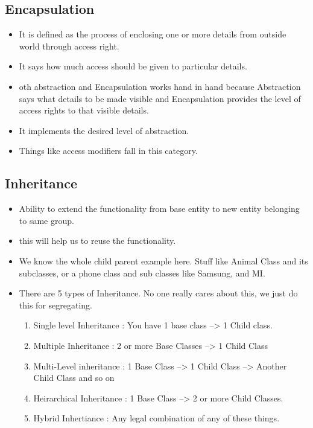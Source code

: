 \documentclass[11pt]{article}
\begin{document}
\subsection{Encapsulation}
\begin{itemize}
	\item It is defined as the process of enclosing one or more details from outside world through access right. 
	\item It says how much access should be given to particular details. 
	\item oth abstraction and Encapsulation works hand in hand because Abstraction says what details to be made visible and Encapsulation provides the level of access rights to that visible details. 
	\item It implements the desired level of abstraction.
	\item Things like access modifiers fall in this category.
\end{itemize}


\subsection{Inheritance}
\begin{itemize}
	\item Ability to extend the functionality from base entity to new entity belonging to same group. 
	\item this will help us to reuse the functionality.
	\item We know the whole child parent example here. Stuff like Animal Class and its subclasses, or a phone class and sub classes like Samsung, and MI. 
	\item There are 5 types of Inheritance. No one really cares about this, we just do this for segregating. 
	\begin{enumerate}
		\item Single level Inheritance : You have 1 base class --> 1 Child class.
		\item Multiple Inheritance : 2 or more Base Classes --> 1 Child Class
		\item Multi-Level inheritance : 1 Base Class --> 1 Child Class --> Another Child Class and so on
		\item Heirarchical Inheritance : 1 Base Class --> 2 or more Child Classes. 
		\item Hybrid Inhertiance : Any legal combination of any of these things. 
	\end{enumerate}
	
\end{itemize}
\end{document}
